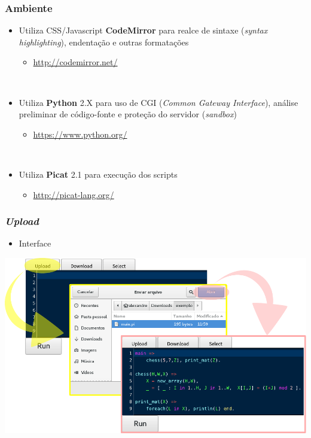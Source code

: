 \documentclass[brazil]{beamer}
\begin{document}
\begin{frame}

    \frametitle{Ambiente}

    \begin{itemize}
      \item Utiliza CSS/Javascript \textbf{CodeMirror} para realce de sintaxe (\textit{syntax highlighting}), endentação e outras formatações
      \begin{itemize}
        \item \url{http://codemirror.net/}
      \end{itemize} ~\\

      \item Utiliza \textbf{Python} 2.X para uso de CGI (\textit{Common Gateway Interface}), análise preliminar de código-fonte e proteção do servidor (\textit{sandbox})
      \begin{itemize}
        \item \url{https://www.python.org/}
      \end{itemize} ~\\

      \item Utiliza \textbf{Picat} 2.1 para execução dos scripts
      \begin{itemize}
        \item \url{http://picat-lang.org/}
      \end{itemize}

    \end{itemize}
\end{frame}


\begin{frame}

    \frametitle{\textit{Upload}}

    \begin{itemize}
      \item Interface
    \end{itemize}

\begin{center}
\includegraphics[width=.8\textwidth]{figures/func-upload.pdf}
\end{center}

\end{frame}
\end{document}
